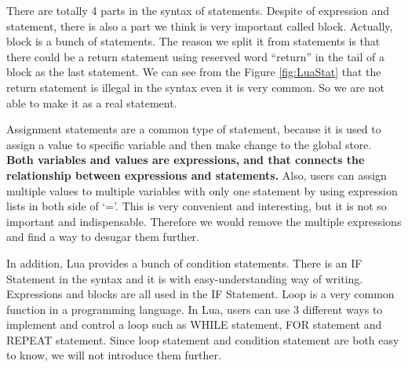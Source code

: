 \documentclass{article}
\begin{document}
There are totally 4 parts in the syntax of statements. Despite of expression and statement, there is also a part we think is very important called block. Actually, block is a bunch of statements. The reason we split it from statements is that there could be a return statement using reserved word ``return'' in the tail of a block as the last statement. We can see from the Figure \ref{fig:LuaStat} that the return statement is illegal in the syntax even it is very common. So we are not able to make it as a real statement.

Assignment statements are a common type of statement, because it is used to assign a value to specific variable and then make change to the global store. {\bf Both variables and values are expressions, and that connects the relationship between expressions and statements.} Also, users can assign multiple values to multiple variables with only one statement by using expression lists in both side of `='. This is very convenient and interesting, but it is not so important and indispensable. Therefore we would remove the multiple expressions and find a way to desugar them further. 

In addition, Lua provides a bunch of condition statements. There is an IF Statement in the syntax and it is with easy-understanding way of writing. Expressions and blocks are all used in the IF Statement. Loop is a very common function in a programming language. In Lua, users can use 3 different ways to implement and control a loop such as WHILE statement, FOR statement and REPEAT statement. Since loop statement and condition statement are both easy to know, we will not introduce them further.

\newcommand{\assign}[2]{{\overline{#1_i}}~{=}~{\overline{#2_j}}}
\newcommand{\doe}[1]{\mbox{\tt do}~#1~{\tt end}}
\newcommand{\ife}[3]{\mbox{\tt if}~{#1}~\mbox{\tt then}~{#2}~\mbox{\tt else}~{#3}~{\tt end}}
\newcommand{\whilee}[2]{\mbox{\tt while}~#1~{\tt do}~#2~{\tt end}}
\newcommand{\repeate}[2]{\mbox{\tt repeat}~#2~{\tt until}~#1~}
\newcommand{\for}[3]{\mbox{\tt for}~#1~=~#2_1,~#2_2,~#2_3~{\tt do}~#3~{\tt end}}
\newcommand{\function}[3]{\mbox{\tt function}~#1({\overline{#2_i}})~#3~{\tt end}}
\newcommand{\local}[2]{\mbox{\tt local}~{\assign #1 #2}}
\end{document}
